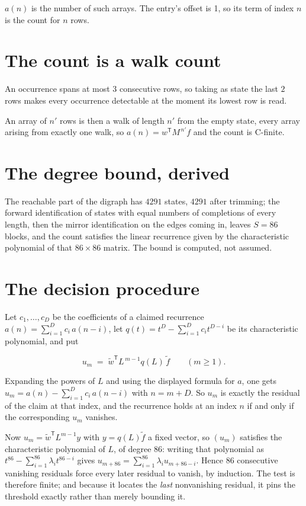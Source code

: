 \documentclass[11pt]{article}
\theoremstyle{definition}
\begin{document}
$a(n)$ is the number of such arrays. The entry's offset is 1, so its term of index $n$ is the count for $n$ rows.

\section{The count is a walk count}

An occurrence spans at most $3$ consecutive rows, so taking as state the last $2$ rows makes every occurrence detectable at the moment its lowest row is read.

An array of $n'$ rows is then a walk of length $n'$ from the empty state, every array arising from exactly one walk, so $a(n) = w^{\mathsf T}M^{\,n'}f$ and the count is C-finite.

\section{The degree bound, derived}

The reachable part of the digraph has $4291$ states, $4291$ after trimming; the forward identification of states with equal numbers of completions of every length, then the mirror identification on the edges coming in, leaves $S = 86$ blocks, and the count satisfies the linear recurrence given by the characteristic polynomial of that $86\times86$ matrix. The bound is computed, not assumed.

\section{The decision procedure}

Let $c_1,\dots,c_D$ be the coefficients of a claimed recurrence $a(n) = \sum_{i=1}^{D} c_i\,a(n-i)$, let $q(t) = t^{D} - \sum_{i=1}^{D} c_i t^{D-i}$ be its characteristic polynomial, and put

\[u_m \;=\; \tilde w^{\mathsf T} L^{\,m-1} q(L)\,\tilde f \qquad (m \ge 1).\]

Expanding the powers of $L$ and using the displayed formula for $a$, one gets $u_m = a(n) - \sum_{i=1}^{D} c_i\,a(n-i)$ with $n = m + D$. So $u_m$ is exactly the residual of the claim at that index, and the recurrence holds at an index $n$ if and only if the corresponding $u_m$ vanishes.

Now $u_m = \tilde w^{\mathsf T} L^{m-1} y$ with $y = q(L)\tilde f$ a fixed vector, so $(u_m)$ satisfies the characteristic polynomial of $L$, of degree $86$: writing that polynomial as $t^{86} - \sum_{i=1}^{86} \lambda_i t^{86-i}$ gives $u_{m+86} = \sum_{i=1}^{86} \lambda_i u_{m+86-i}$. Hence $86$ consecutive vanishing residuals force every later residual to vanish, by induction. The test is therefore finite; and because it locates the {\itshape last} nonvanishing residual, it pins the threshold exactly rather than merely bounding it.
\end{document}
